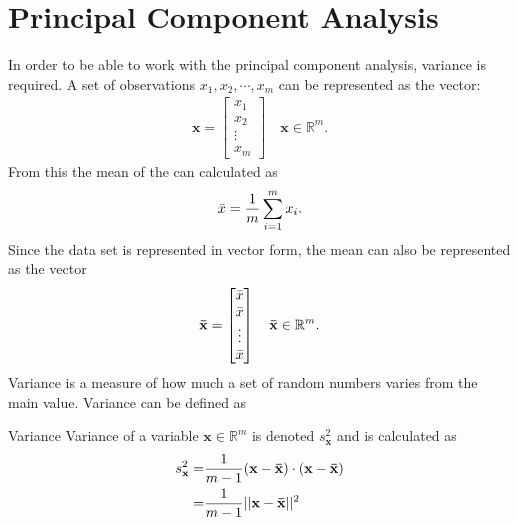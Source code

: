 \chapter{Principal Component Analysis}





In order to be able to work with the principal component analysis, variance is required.
A set of observations $x_1,x_2,\cdots, x_m$ can be represented as the vector:
\begin{align*}
    \mathbf{x}=
    \begin{bmatrix}
    x_1\\
    x_2\\
    \vdots\\
    x_m
\end{bmatrix} \quad \textbf{x}\in\mathbb{R}^m.
\end{align*}
From this the mean of the can calculated as
\begin{align*}
    \Bar{x}=\frac{1}{m}\sum_{i=1}^mx_i.
\end{align*}
Since the data set is represented in vector form, the mean can also be represented as the vector
\begin{align*}
\mathbf{\Bar{x}}=
    \begin{bmatrix}
    \Bar{x}\\
    \Bar{x}\\
    \vdots\\
    \Bar{x}\\
    \end{bmatrix}\quad \mathbf{\Bar{x}}\in\mathbb{R}^m.
\end{align*}
Variance is a measure of how much a set of random numbers varies from the main value. Variance can be defined as 
\begin{definition}{Variance}
Variance of a variable $\textbf{x}\in\mathbb{R}^m$ is denoted $s_\textbf{x}^2$ and is calculated as
\begin{align*}
    s_\textbf{x}^2=&\frac{1}{m-1}(\mathbf{x}-\mathbf{\Bar{x}})\cdot(\mathbf{x}-\mathbf{\Bar{x}})\\
    =&\frac{1}{m-1}||\mathbf{x}-\mathbf{\Bar{x}}||^2
\end{align*}
\end{definition}
